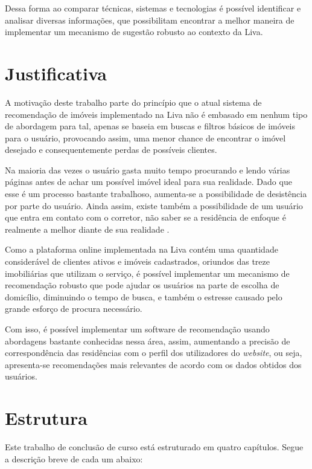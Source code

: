  Dessa forma ao comparar técnicas, sistemas e tecnologias é possível identificar e analisar diversas informações, que possibilitam encontrar a melhor maneira de implementar um mecanismo de sugestão robusto ao contexto da Liva.

\section{Justificativa}

A motivação deste trabalho parte do princípio que o atual sistema de recomendação de imóveis implementado na Liva não é embasado em nenhum tipo de abordagem para tal, apenas se baseia em buscas e filtros básicos de imóveis para o usuário, provocando assim, uma menor chance de encontrar o imóvel desejado e consequentemente perdas de possíveis clientes.

Na maioria das vezes o usuário gasta muito tempo procurando e lendo várias páginas antes de achar um possível imóvel ideal para sua realidade. Dado que esse é um processo bastante trabalhoso, aumenta-se a possibilidade de desistência por parte do usuário. Ainda assim, existe também a possibilidade de um usuário que entra em contato com o corretor, não saber se a residência de enfoque é realmente a melhor diante de sua realidade \cite{Summo:2017}.

Como a plataforma online implementada na Liva contém uma quantidade considerável de clientes ativos e imóveis cadastrados, oriundos das treze imobiliárias que utilizam o serviço, é possível implementar um mecanismo de recomendação robusto que pode ajudar os usuários na parte de escolha de domicílio, diminuindo o tempo de busca, e também o estresse causado pelo grande esforço de procura necessário.

Com isso, é possível implementar um software de recomendação usando abordagens bastante conhecidas nessa área, assim, aumentando a precisão de correspondência das residências com o perfil dos utilizadores do \textit{website}, ou seja, apresenta-se recomendações mais relevantes de acordo com os dados obtidos dos usuários.


\section{Estrutura}

Este trabalho de conclusão de curso está estruturado em quatro capítulos. Segue a descrição breve de cada um abaixo:

